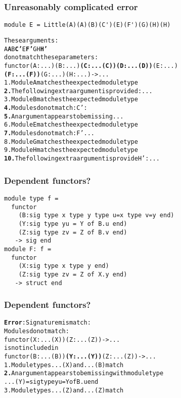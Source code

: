 \documentclass[11pt,aspectratio=169]{beamer}
\begin{document}
\begin{frame}[fragile]\frametitle{Unreasonably complicated error}
\begin{verbatim}
module E = Little(A)(A)(B)(C')(E)(F')(G)(H)(H)
\end{verbatim}
  \footnotesize
\begin{alltt}
These arguments:
  {\color{green}{}A} {\color{red}{}\bfseries{}A} {\color{green}{}B} {\color{magenta}{}\bfseries{}C'} {\color{red}{}\bfseries{}} {\color{green}{}E} {\color{magenta}{}\bfseries{}F'} {\color{green}{}G} {\color{green}{}H} {\color{red}{}\bfseries{}H'}
do not match these parameters:
  functor {\color{green}{}(A : ...)} {\color{red}{}\bfseries{}} {\color{green}{}(B : ...)} {\color{magenta}{}\bfseries{}(C : ...(C))} {\color{red}{}\bfseries{}(D : ...(D))} {\color{green}{}(E : ...)}
  {\color{magenta}{}\bfseries{}(F : ...(F))} {\color{green}{}(G : ...)} {\color{green}{}(H : ...)} {\color{red}{}\bfseries{}} -> ...
{\color{green}{}1.} Module A matches the expected module type
{\color{red}{}\bfseries{}2.} The following extra argument is provided: ...
{\color{green}{}3.} Module B matches the expected module type
{\color{magenta}{}\bfseries{}4.} Modules do not match: C' :
{\color{red}{}\bfseries{}5.} An argument appears to be missing ...
{\color{green}{}6.} Module E matches the expected module type
{\color{magenta}{}\bfseries{}7.} Modules do not match: F' ...
{\color{green}{}8.} Module G matches the expected module type
{\color{green}{}9.} Module H matches the expected module type
{\color{red}{}\bfseries{}10.} The following extra argument is provide H' : ...
\end{alltt}
\end{frame}



\begin{frame}[fragile]\frametitle{Dependent functors?}
\begin{verbatim}
module type f =
  functor
    (B:sig type x type y type u=x type v=y end)
    (Y:sig type yu = Y of B.u end)
    (Z:sig type zv = Z of B.v end)
   -> sig end
module F: f =
  functor
    (X:sig type x type y end)
    (Z:sig type zv = Z of X.y end)
   -> struct end
\end{verbatim}
\end{frame}

\begin{frame}[fragile]\frametitle{Dependent functors?}
\begin{alltt}
{\bfseries{}\color{red}{}Error}: Signature mismatch:
       Modules do not match:
         functor {\color{green}{}(X : ...(X))} {\color{red}{}\bfseries{}} {\color{green}{}(Z : ...(Z))} -> ...
       is not included in
         functor {\color{green}{}(B : ...(B))} {\color{red}{}\bfseries{}(Y : ...(Y))} {\color{green}{}(Z : ...(Z))} -> ...
  {\color{green}{}1.} Module types ...(X) and ...(B) match
  {\color{red}{}\bfseries{}2.} An argument appears to be missing with module type
         ...(Y) = sig type yu = Y of B.u end
  {\color{green}{}3.} Module types ...(Z) and ...(Z) match
\end{alltt}
\end{frame}
\end{document}
